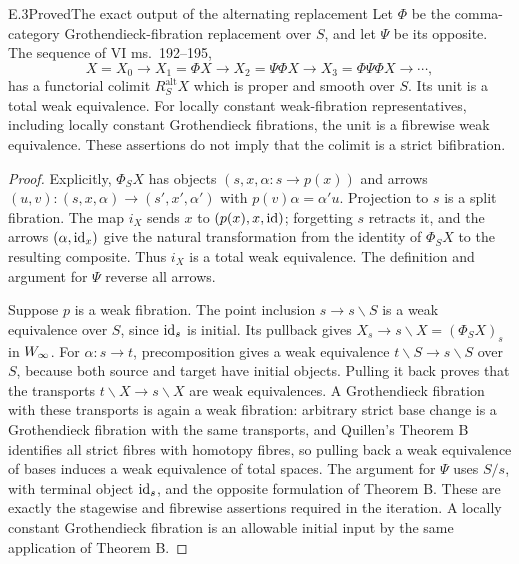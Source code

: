 \begin{statement}{E.3}{Proved}{The exact output of the alternating replacement}
Let $\Phi$ be the comma-category Grothendieck-fibration replacement over $S$, and let $\Psi$ be its opposite. The sequence of VI ms.~192--195,
\[
 X=X_0\longrightarrow X_1=\Phi X\longrightarrow X_2=\Psi\Phi X
 \longrightarrow X_3=\Phi\Psi\Phi X\longrightarrow\cdots,
\]
has a functorial colimit $R^{\mathrm{alt}}_SX$ which is proper and smooth over $S$. Its unit is a total weak equivalence. For locally constant weak-fibration representatives, including locally constant Grothendieck fibrations, the unit is a fibrewise weak equivalence. These assertions do not imply that the colimit is a strict bifibration.
\end{statement}
\begin{proof}
Explicitly, $\Phi_SX$ has objects $(s,x,\alpha:s\to p(x))$ and arrows $(u,v):(s,x,\alpha)\to(s',x',\alpha')$ with $p(v)\alpha=\alpha'u$. Projection to $s$ is a split fibration. The map $i_X$ sends $x$ to $(p(x),x,\mathrm{id})$; forgetting $s$ retracts it, and the arrows $(\alpha,\mathrm{id}_x)$ give the natural transformation from the identity of $\Phi_SX$ to the resulting composite. Thus $i_X$ is a total weak equivalence. The definition and argument for $\Psi$ reverse all arrows.

Suppose $p$ is a weak fibration. The point inclusion $s\to s\backslash S$ is a weak equivalence over $S$, since $\mathrm{id}_s$ is initial. Its pullback gives $X_s\to s\backslash X=(\Phi_SX)_s$ in $W_{\infty}$. For $\alpha:s\to t$, precomposition gives a weak equivalence $t\backslash S\to s\backslash S$ over $S$, because both source and target have initial objects. Pulling it back proves that the transports $t\backslash X\to s\backslash X$ are weak equivalences. A Grothendieck fibration with these transports is again a weak fibration: arbitrary strict base change is a Grothendieck fibration with the same transports, and Quillen's Theorem B identifies all strict fibres with homotopy fibres, so pulling back a weak equivalence of bases induces a weak equivalence of total spaces. The argument for $\Psi$ uses $S/s$, with terminal object $\mathrm{id}_s$, and the opposite formulation of Theorem B. These are exactly the stagewise and fibrewise assertions required in the iteration. A locally constant Grothendieck fibration is an allowable initial input by the same application of Theorem B.


\end{proof}
